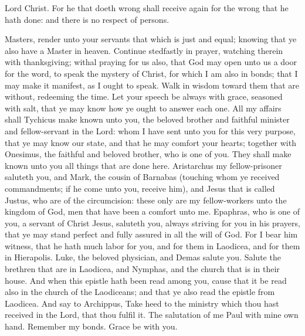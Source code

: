 Lord Christ. For he that doeth wrong shall receive again for the wrong that he hath done: and there is no respect of persons. 

Masters, render unto your servants that which is just and equal; knowing that ye also have a Master in heaven.  Continue stedfastly in prayer, watching therein with thanksgiving; withal praying for us also, that God may open unto us a door for the word, to speak the mystery of Christ, for which I am also in bonds; that I may make it manifest, as I ought to speak. Walk in wisdom toward them that are without, redeeming the time. Let your speech be always with grace, seasoned with salt, that ye may know how ye ought to answer each one.  All my affairs shall Tychicus make known unto you, the beloved brother and faithful minister and fellow-servant in the Lord: whom I have sent unto you for this very purpose, that ye may know our state, and that he may comfort your hearts; together with Onesimus, the faithful and beloved brother, who is one of you. They shall make known unto you all things that are done here.  Aristarchus my fellow-prisoner saluteth you, and Mark, the cousin of Barnabas (touching whom ye received commandments; if he come unto you, receive him), and Jesus that is called Justus, who are of the circumcision: these only are my fellow-workers unto the kingdom of God, men that have been a comfort unto me. Epaphras, who is one of you, a servant of Christ Jesus, saluteth you, always striving for you in his prayers, that ye may stand perfect and fully assured in all the will of God. For I bear him witness, that he hath much labor for you, and for them in Laodicea, and for them in Hierapolis. Luke, the beloved physician, and Demas salute you. Salute the brethren that are in Laodicea, and Nymphas, and the church that is in their house. And when this epistle hath been read among you, cause that it be read also in the church of the Laodiceans; and that ye also read the epistle from Laodicea. And say to Archippus, Take heed to the ministry which thou hast received in the Lord, that thou fulfil it.  The salutation of me Paul with mine own hand. Remember my bonds. Grace be with you. 